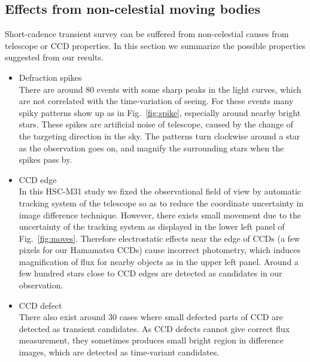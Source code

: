 \documentclass[iop, apj]{emulateapj}
\newcommand{\?}{\stackrel{?}{=}}
\begin{document}
\subsection{Effects from non-celestial moving bodies}
\label{sec:noncelestial}
Short-cadence transient survey can be suffered from non-celestial causes 
from telescope or CCD properties. 
In this section we summarize the possible properties suggested from our results. 
\begin{itemize}
	\item{Defraction spikes}\\
	There are around $80$ events with some sharp peaks in the light curves, 
	which are not correlated with the time-variation of seeing.  
	For these events many spiky patterns show up as in Fig.~\ref{fig:spike}, especially around nearby bright stars. 
	These spikes are artificial noise of telescope, caused by the change of the targeting direction in the sky. 
	The patterns turn clockwise around a star as the observation goes on, and 
	magnify the surrounding stars when the spikes pass by. 
	\item{CCD edge}\\
	In this HSC-M31 study we fixed the observational field of view by automatic tracking system of the telescope so as to reduce the coordinate uncertainty in image difference technique. However, there exists small movement due to the uncertainty of the tracking system as displayed in the lower left panel of Fig.~\ref{fig:moves}. Therefore electrostatic effects near the edge of CCDs (a few pixels for our Hamamatsu CCDs) cause incorrect photometry,  which induces magnification of flux for nearby objects as in the upper left panel. Around a few hundred stars close to CCD edges are detected as candidates in our observation. 
	
	\item{CCD defect}\\
	There also exist around $30$ cases where small defected parts of CCD are detected as transient candidates. As CCD defects cannot give correct flux measurement, they sometimes produces small bright region in difference images, which are detected as time-variant candidates.  


\end{itemize}
\end{document}
